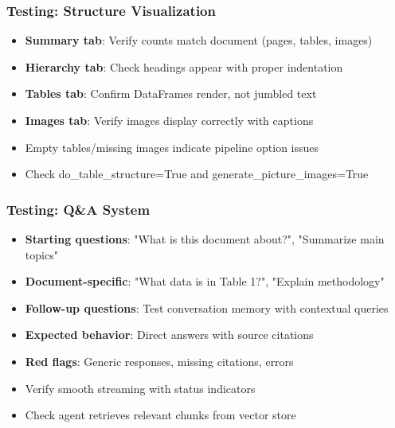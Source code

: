 \begin{frame}[fragile]\frametitle{Testing: Structure Visualization}
      \begin{itemize}
        \item \textbf{Summary tab}: Verify counts match document (pages, tables, images)
        \item \textbf{Hierarchy tab}: Check headings appear with proper indentation
        \item \textbf{Tables tab}: Confirm DataFrames render, not jumbled text
        \item \textbf{Images tab}: Verify images display correctly with captions
        \item Empty tables/missing images indicate pipeline option issues
        \item Check do\_table\_structure=True and generate\_picture\_images=True
      \end{itemize}
\end{frame}

\begin{frame}[fragile]\frametitle{Testing: Q\&A System}
      \begin{itemize}
        \item \textbf{Starting questions}: "What is this document about?", "Summarize main topics"
        \item \textbf{Document-specific}: "What data is in Table 1?", "Explain methodology"
        \item \textbf{Follow-up questions}: Test conversation memory with contextual queries
        \item \textbf{Expected behavior}: Direct answers with source citations
        \item \textbf{Red flags}: Generic responses, missing citations, errors
        \item Verify smooth streaming with status indicators
        \item Check agent retrieves relevant chunks from vector store
      \end{itemize}
\end{frame}


